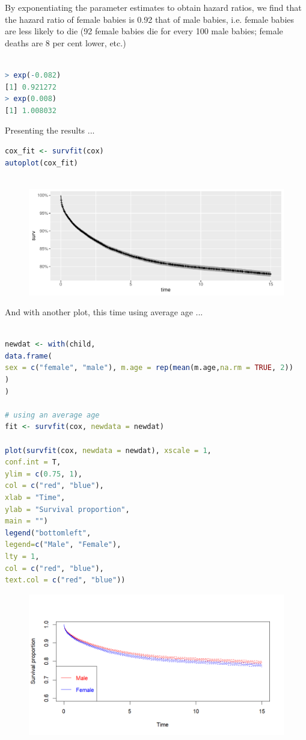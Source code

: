 \documentclass[12pt,letterpaper]{article}
\begin{document}
\noindent By exponentiating the parameter estimates to obtain hazard ratios, we find that the hazard ratio of female babies is 0.92 that of male babies, i.e. female babies are less
likely to die (92 female babies die for every 100 male babies; female deaths are 8 per cent lower, etc.)

\begin{lstlisting}[language=R]

> exp(-0.082)
[1] 0.921272
> exp(0.008)
[1] 1.008032

\end{lstlisting}
	
\noindent Presenting the results ...

\begin{lstlisting}[language=R]
cox_fit <- survfit(cox)
autoplot(cox_fit)
	
\end{lstlisting}




\begin{figure}[htbp]
	\includegraphics[width=1\linewidth]{Rplot}
	\label{fig:rplot}
\end{figure}

\noindent And with another plot, this time using average age ...

\begin{lstlisting}[language=R]

newdat <- with(child, 
data.frame(
sex = c("female", "male"), m.age = rep(mean(m.age,na.rm = TRUE, 2))
)
)

# using an average age
fit <- survfit(cox, newdata = newdat)

plot(survfit(cox, newdata = newdat), xscale = 1,
conf.int = T,
ylim = c(0.75, 1),
col = c("red", "blue"),
xlab = "Time",
ylab = "Survival proportion",
main = "")
legend("bottomleft",
legend=c("Male", "Female"),
lty = 1, 
col = c("red", "blue"),
text.col = c("red", "blue"))
\end{lstlisting}

\begin{figure}[htbp]
	\centering
	\includegraphics[width=1\linewidth]{Rplot03}
	\label{fig:rplot01}
\end{figure}
\end{document}
